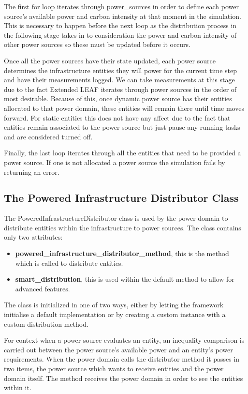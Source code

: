\documentclass{l4proj}
\begin{document}
The first for loop iterates through power\_sources in order to define each power source's available power and carbon intensity at that moment in the simulation.
This is necessary to happen before the next loop as the distribution process in the following stage takes in to consideration the power and carbon intensity of other power sources so these must be updated before it occurs.

Once all the power sources have their state updated, each power source determines the infrastructure entities they will power for the current time step and have their measurements logged.
We can take measurements at this stage due to the fact Extended LEAF iterates through power sources in the order of most desirable.
Because of this, once dynamic power source has their entities allocated to that power domain, these entities will remain there until time moves forward.
For static entities this does not have any affect due to the fact that entities remain associated to the power source but just pause any running tasks and are considered turned off.

Finally, the last loop iterates through all the entities that need to be provided a power source.
If one is not allocated a power source the simulation fails by returning an error.

\subsection{The Powered Infrastructure Distributor Class}\label{imp:subsec:distributor}
The PoweredInfrastructureDistributor class is used by the power domain to distribute entities within the infrastructure to power sources.
The class contains only two attributes:
\begin{itemize}
    \item \textbf{powered\_infrastructure\_distributor\_method}, this is the method which is called to distribute entities.
    \item \textbf{smart\_distribution}, this is used within the default method to allow for advanced features.
\end{itemize}
The class is initialized in one of two ways, either by letting the framework initialise a default implementation or by creating a custom instance with a custom distribution method.

For context when a power source evaluates an entity, an inequality comparison is carried out between the power source's available power and an entity's power requirements.
When the power domain calls the distributor method it passes in two items, the power source which wants to receive entities and the power domain itself.
The method receives the power domain in order to see the entities within it.
\end{document}
